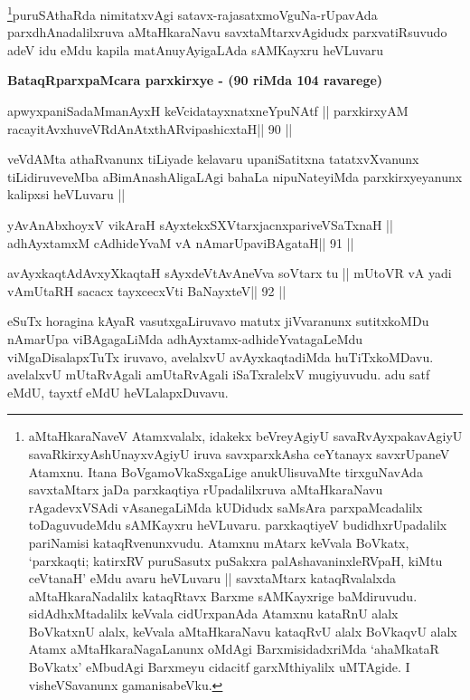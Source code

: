\begin{artha}
\footnote[1]{aMtaHkaraNaveV Atamxvalalx, idakekx beVreyAgiyU 
savaRvAyxpakavAgiyU savaRkirxyAshUnayxvAgiyU iruva savxparxkAsha ceYtanayx
  savxrUpaneV Atamxnu. Itana BoVgamoVkaSxgaLige anukUlisuvaMte
  tirxguNavAda savxtaMtarx jaDa parxkaqtiya rUpadalilxruva 
  aMtaHkaraNavu rAgadevxVSAdi vAsanegaLiMda kUDidudx saMsAra parxpaMcadalilx
toDaguvudeMdu sAMKayxru heVLuvaru. parxkaqtiyeV budidhxrUpadalilx
pariNamisi kataqRvenunxvudu. Atamxnu mAtarx keVvala BoVkatx,
`parxkaqti; katirxRV puruSasutx puSakxra palAshavaninxleRVpaH, kiMtu
ceVtanaH' eMdu avaru heVLuvaru || savxtaMtarx kataqRvalalxda
aMtaHkaraNadalilx kataqRtavx Barxme sAMKayxrige baMdiruvudu.
sidAdhxMtadalilx keVvala cidUrxpanAda Atamxnu kataRnU alalx BoVkatxnU
alalx, keVvala aMtaHkaraNavu kataqRvU alalx BoVkaqvU alalx Atamx
aMtaHkaraNagaLanunx oMdAgi BarxmisidadxriMda `ahaMkataR BoVkatx'
eMbudAgi Barxmeyu cidacitf garxMthiyalilx uMTAgide. I visheVSavanunx gamanisabeVku.}puruSAthaRda nimitatxvAgi
satavx-rajasatxmoVguNa-rUpavAda parxdhAnadalilxruva aMtaHkaraNavu
savxtaMtarxvAgidudx parxvatiRsuvudo adeV idu eMdu kapila
matAnuyAyigaLAda sAMKayxru heVLuvaru
\end{artha}

{\centerline{\textbf{BataqRparxpaMcara parxkirxye - (90 riMda 104 ravarege)}}}

\medskip

\begin{shl}
apwyxpaniSadaMmanAyxH keVcidatayxnatxneYpuNAtf ||
parxkirxyAM racayitAvx\s\s huveVRdAnAtxthARvipashicxtaH\hfill || 90 ||
\end{shl}

\begin{artha}
veVdAMta athaRvanunx tiLiyade kelavaru upaniSatitxna tatatxvXvanunx
tiLidiruveveMba aBimAnashAligaLAgi bahaLa nipuNateyiMda
parxkirxyeyanunx kalipxsi heVLuvaru ||
\end{artha}

\begin{shl}
yAvAnAbxhoyxV vikAraH sAyxtekxSXVtarxjacnxpariveVSaTxnaH ||
adhAyxtamxM cAdhideYvaM vA nAmarUpaviBAgataH\hfill || 91 ||
\end{shl}

\begin{shl}
avAyxkaqtAdAvxyXkaqtaH sAyxdeVtAvAneVva soV\s tarx tu ||
mUtoVR vA yadi vA\s mUtaRH sacacx tayxcecxVti BaNayxteV\hfill || 92 ||
\end{shl}

\begin{artha}
eSuTx horagina kAyaR vasutxgaLiruvavo matutx jiVvaranunx sutitxkoMDu
nAmarUpa viBAgagaLiMda adhAyxtamx-adhideYvatagaLeMdu viMgaDisalapxTuTx
iruvavo, avelalxvU avAyxkaqtadiMda huTiTxkoMDavu. avelalxvU
mUtaRvAgali amUtaRvAgali iSaTxralelxV mugiyuvudu. adu satf eMdU,
tayxtf eMdU heVLalapxDuvavu.
\end{artha}

